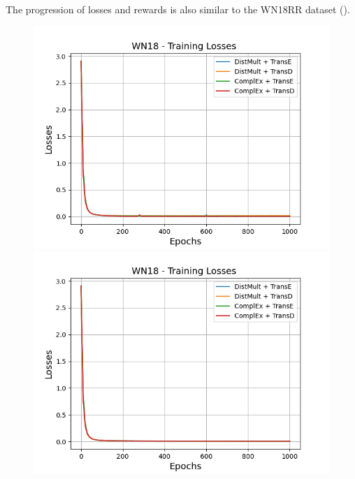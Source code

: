 The progression of losses and rewards is also similar to the \textsc{WN18RR} dataset ().
\begin{figure}
    \centering
    \begin{minipage}{.5\textwidth}
      \centering
      \includegraphics[width=0.9\linewidth]{figures/results/gan_train/not_pretrained/uncertainty/max/entropy/wn18/1k_epochs/uncertainty_wn18_losses.png}
    \end{minipage}%
    \begin{minipage}{.5\textwidth}
      \centering
      \includegraphics[width=0.9\linewidth]{figures/results/gan_train/not_pretrained/uncertainty/max_distribution/entropy/wn18/1k_epochs/uncertainty_wn18_losses.png}
    \end{minipage}
    \begin{minipage}{.5\textwidth}

\end{minipage}
\end{figure}
